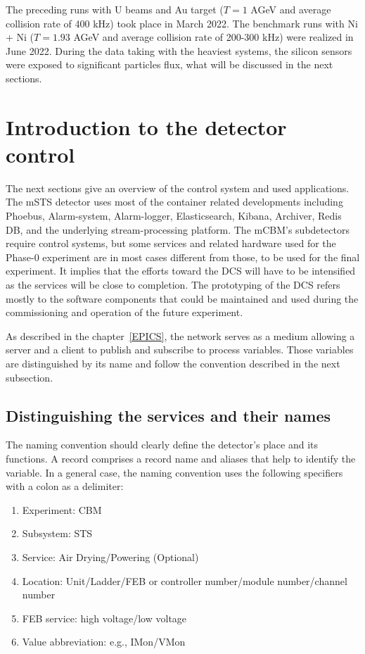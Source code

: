 The preceding runs with U beams and Au target ($T = 1$ AGeV and average collision rate of 400 kHz) took place in March 2022. The benchmark runs with Ni + Ni ($T = 1.93$ AGeV and average collision rate of 200-300 kHz) were realized in June 2022. During the data taking with the heaviest systems, the silicon sensors were exposed to significant particles flux, what will be discussed in the next sections. 
\section{Introduction to the detector control}
The next sections give an overview of the control system and used applications. The \gls{mSTS} detector uses most of the container related developments including Phoebus, Alarm-system, Alarm-logger, Elasticsearch, Kibana, Archiver, Redis \gls{DB}, and the underlying stream-processing platform. The mCBM's subdetectors require control systems, but some services and related hardware used for the Phase-0 experiment are in most cases different from those, to be used for the final experiment. It implies that the efforts toward the \gls{DCS} will have to be intensified as the services will be close to completion. The prototyping of the \gls{DCS} refers mostly to the software components that could be maintained and used during the commissioning and operation of the future experiment. 

As described in the chapter~\ref{EPICS}, the network serves as a medium allowing a server and a client to publish and subscribe to process variables. Those variables are distinguished by its name and follow the convention described in the next subsection.
\subsection{Distinguishing the services and their names}
The naming convention should clearly define the detector's place and its functions.  A record comprises a record name and aliases that help to identify the variable. In a general case, the naming convention uses the following specifiers with a colon as a delimiter:
\begin{enumerate} 
\item Experiment: CBM
\item Subsystem: \gls{STS}
\item Service: Air Drying/Powering (Optional)
\item Location: Unit/Ladder/FEB or controller number/module number/channel number
\item \gls{FEB} service: high voltage/low voltage
\item Value abbreviation: e.g., IMon/VMon
\end{enumerate}

